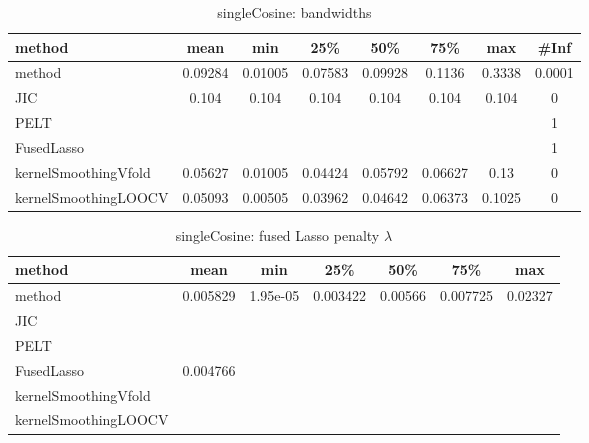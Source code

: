 \begin{table}[ht]
\centering
\begin{tabular}{l|c|ccccc|c}
  \hline
method & mean & min & 25\% & 50\% & 75\% & max & \#Inf \\ 
  \hline
method & 0.09284 & 0.01005 & 0.07583 & 0.09928 & 0.1136 & 0.3338 & 0.0001 \\ 
  JIC & 0.104 & 0.104 & 0.104 & 0.104 & 0.104 & 0.104 &   0 \\ 
  PELT &  &  &  &  &  &  &   1 \\ 
  FusedLasso &  &  &  &  &  &  &   1 \\ 
  kernelSmoothingVfold & 0.05627 & 0.01005 & 0.04424 & 0.05792 & 0.06627 &  0.13 &   0 \\ 
  kernelSmoothingLOOCV & 0.05093 & 0.00505 & 0.03962 & 0.04642 & 0.06373 & 0.1025 &   0 \\ 
   \hline
\end{tabular}
\caption{singleCosine: bandwidths} 
\label{tab:singleCosineBandwidths}
\end{table}
\begin{table}[ht]
\centering
\begin{tabular}{l|c|ccccc}
  \hline
method & mean & min & 25\% & 50\% & 75\% & max \\ 
  \hline
method & 0.005829 & 1.95e-05 & 0.003422 & 0.00566 & 0.007725 & 0.02327 \\ 
  JIC &  &  &  &  &  &  \\ 
  PELT &  &  &  &  &  &  \\ 
  FusedLasso & 0.004766 &  &  &  &  &  \\ 
  kernelSmoothingVfold &  &  &  &  &  &  \\ 
  kernelSmoothingLOOCV &  &  &  &  &  &  \\ 
   \hline
\end{tabular}
\caption{singleCosine: fused Lasso penalty $\lambda$} 
\label{tab:singleCosineLambdas}
\end{table}
